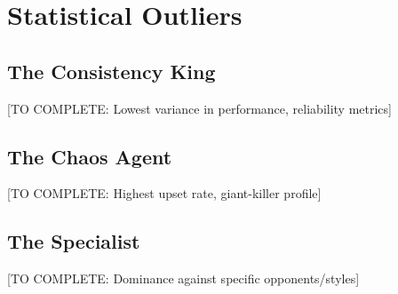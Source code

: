 \section{Statistical Outliers}

\subsection{The Consistency King}

[TO COMPLETE: Lowest variance in performance, reliability metrics]

\subsection{The Chaos Agent}

[TO COMPLETE: Highest upset rate, giant-killer profile]

\subsection{The Specialist}

[TO COMPLETE: Dominance against specific opponents/styles]